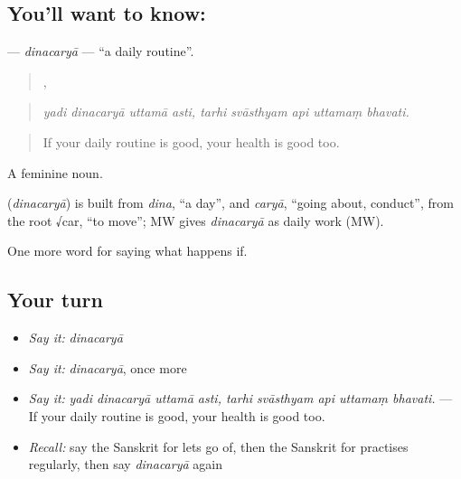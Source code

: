 \subsection*{You'll want to know: }
\textbf{} — \emph{dinacaryā} — \textquotedblleft{}a daily routine\textquotedblright{}.

\begin{quote}
   ,     
\end{quote}

\begin{quote}
\emph{yadi dinacaryā uttamā asti, tarhi svāsthyam api uttamaṃ bhavati.}
\end{quote}

\begin{quote}
If your daily routine is good, your health is good too.
\end{quote}

A feminine noun.

\begin{cousinweb}
\textbf{} (\emph{dinacaryā}) is built from \emph{dina}, \textquotedblleft{}a day\textquotedblright{}, and \emph{caryā}, \textquotedblleft{}going about, conduct\textquotedblright{}, from the root √car, \textquotedblleft{}to move\textquotedblright{}; MW gives \emph{dinacaryā} as daily work (MW).
\end{cousinweb}

\begin{grammarlens}[title={What you've built}]
One more word for saying what happens if.
\end{grammarlens}

\subsection*{Your turn}
\begin{itemize}
\raggedright
  \item \emph{Say it:} \emph{dinacaryā}
  \item \emph{Say it:} \emph{dinacaryā}, once more
  \item \emph{Say it:} \emph{yadi dinacaryā uttamā asti, tarhi svāsthyam api uttamaṃ bhavati.} — If your daily routine is good, your health is good too.
  \item \emph{Recall:} say the Sanskrit for lets go of, then the Sanskrit for practises regularly, then say \emph{dinacaryā} again
\end{itemize}


